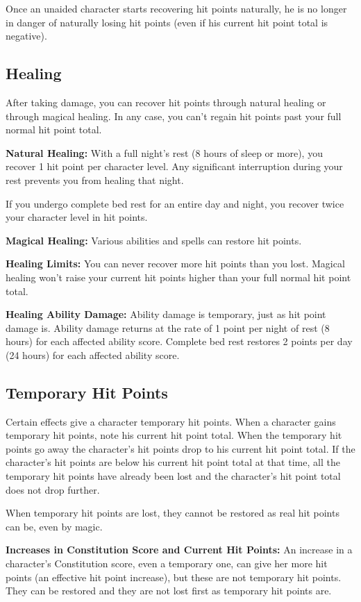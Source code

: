 Once an unaided character starts recovering hit points naturally, he is no longer in danger of naturally losing hit points (even if his current hit point total is negative).

\subsection{Healing}
After taking damage, you can recover hit points through natural healing or through magical healing. In any case, you can't regain hit points past your full normal hit point total.

\textbf{Natural Healing:} With a full night's rest (8 hours of sleep or more), you recover 1 hit point per character level. Any significant interruption during your rest prevents you from healing that night.

If you undergo complete bed rest for an entire day and night, you recover twice your character level in hit points.

\textbf{Magical Healing:} Various abilities and spells can restore hit points.

\textbf{Healing Limits:} You can never recover more hit points than you lost. Magical healing won't raise your current hit points higher than your full normal hit point total.

\textbf{Healing Ability Damage:} Ability damage is temporary, just as hit point damage is. Ability damage returns at the rate of 1 point per night of rest (8 hours) for each affected ability score. Complete bed rest restores 2 points per day (24 hours) for each affected ability score.

\subsection{Temporary Hit Points}
Certain effects give a character temporary hit points. When a character gains temporary hit points, note his current hit point total. When the temporary hit points go away the character's hit points drop to his current hit point total. If the character's hit points are below his current hit point total at that time, all the temporary hit points have already been lost and the character's hit point total does not drop further.

When temporary hit points are lost, they cannot be restored as real hit points can be, even by magic.

\textbf{Increases in Constitution Score and Current Hit Points:} An increase in a character's Constitution score, even a temporary one, can give her more hit points (an effective hit point increase), but these are not temporary hit points. They can be restored and they are not lost first as temporary hit points are.

